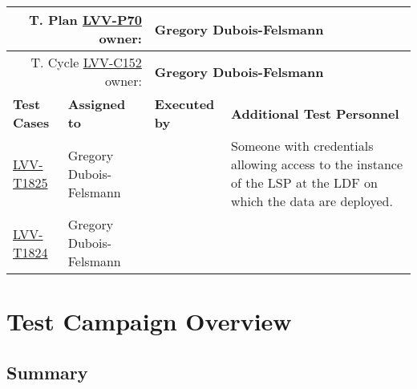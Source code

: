 \documentclass[DM,lsstdraft,STR,toc]{lsstdoc}
\begin{document}
{\small
\begin{longtable}{p{3cm}p{3cm}p{3cm}p{6cm}}
\hline
\multicolumn{2}{r}{T. Plan \href{https://jira.lsstcorp.org/secure/Tests.jspa\#/testPlan/LVV-P70}{LVV-P70} owner:} &
\multicolumn{2}{l}{\textbf{ Gregory Dubois-Felsmann } }\\\hline
\multicolumn{2}{r}{T. Cycle \href{https://jira.lsstcorp.org/secure/Tests.jspa\#/testCycle/LVV-C152}{LVV-C152} owner:} &
\multicolumn{2}{l}{\textbf{
Gregory Dubois-Felsmann }
} \\\hline
\textbf{Test Cases} & \textbf{Assigned to} & \textbf{Executed by} & \textbf{Additional Test Personnel} \\ \hline
\href{https://jira.lsstcorp.org/secure/Tests.jspa#/testCase/LVV-T1825}{LVV-T1825}
& {\small Gregory Dubois-Felsmann } & {\small  } &
\begin{minipage}[]{6cm}
\smallskip
{\small Someone with credentials allowing access to the instance of the LSP at
the LDF on which the data are deployed. }
\medskip
\end{minipage}
\\ \hline
\href{https://jira.lsstcorp.org/secure/Tests.jspa#/testCase/LVV-T1824}{LVV-T1824}
& {\small Gregory Dubois-Felsmann } & {\small  } &
\begin{minipage}[]{6cm}
\smallskip
{\small  }
\medskip
\end{minipage}
\\ \hline
\end{longtable}
}

\newpage

\section{Test Campaign Overview}
\label{sect:overview}

\subsection{Summary}
\label{sect:summarytable}
\end{document}
